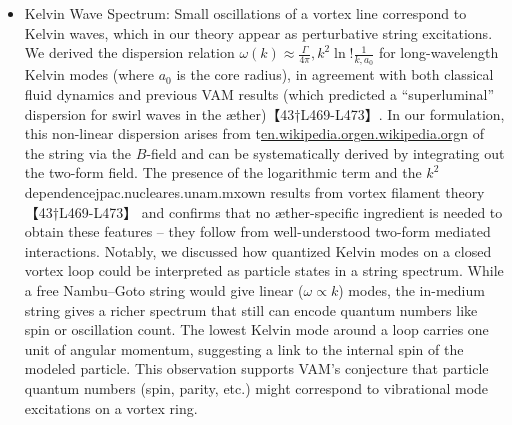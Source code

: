 \documentclass[12pt]{article}
\begin{document}
{{\begin{itemize}
\item 
Kelvin Wave Spectrum: Small oscillations of a vortex line correspond to Kelvin waves, which in our theory appear as perturbative string excitations. We derived the dispersion relation $\displaystyle \omega(k) \approx \frac{\Gamma}{4\pi},k^2 \ln!\frac{1}{k,a_0}$ for long-wavelength Kelvin modes (where $a_0$ is the core radius), in agreement with both classical fluid dynamics and previous VAM results (which predicted a “superluminal” dispersion for swirl waves in the æther)【43†L469-L473】. In our formulation, this non-linear dispersion arises from t\href{https://en.wikipedia.org/wiki/Vortex_ring#:~:text=The%20resulting%20circulation%20Image%3A%20,frac%20%7B7%7D%7B4%7D%7D%5Cright%29%5Cend%7Baligned}{en.wikipedia.org}\href{https://en.wikipedia.org/wiki/Vortex_ring#:~:text=,frac%20%7B1%7D%7B4%7D%7D%5Cright}{en.wikipedia.org}n of the string via the $B$-field and can be systematically derived by integrating out the two-form field. The presence of the logarithmic term and the $k^2$ dependencejpac.nucleares.unam.mxown results from vortex filament theory【43†L469-L473】 and confirms that no æther-specific ingredient is needed to obtain these features – they follow from well-understood two-form mediated interactions. Notably, we discussed how quantized Kelvin modes on a closed vortex loop could be interpreted as particle states in a string spectrum. While a free Nambu–Goto string would give linear ($\omega\propto k$) modes, the in-medium string gives a richer spectrum that still can encode quantum numbers like spin or oscillation count. The lowest Kelvin mode around a loop carries one unit of angular momentum, suggesting a link to the internal spin of the modeled particle. This observation supports VAM’s conjecture that particle quantum numbers (spin, parity, etc.) might correspond to vibrational mode excitations on a vortex ring.





\end{itemize}}}
\end{document}
